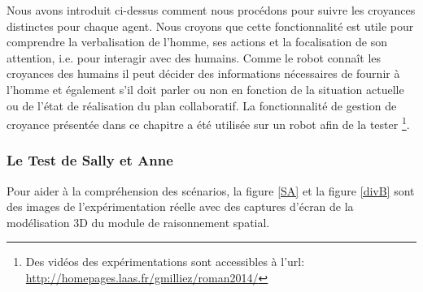 \documentclass[a4paper,11pt,twoside]{StyleThese}
\begin{document}
Nous avons introduit ci-dessus comment nous procédons pour suivre les croyances distinctes pour chaque agent. Nous croyons que cette fonctionnalité est utile pour comprendre la verbalisation de l'homme, ses actions et la focalisation de son attention, i.e. pour interagir avec des humains. Comme le robot connaît les croyances des humains il peut décider des informations nécessaires de fournir à l'homme et également s'il doit parler ou non en fonction de la situation actuelle ou de l'état de réalisation du plan collaboratif. La fonctionnalité de gestion de croyance présentée dans ce chapitre a été utilisée sur un robot afin de la tester \footnote{Des vidéos des expérimentations sont accessibles à l'url: \url{http://homepages.laas.fr/gmilliez/roman2014/}}.




\subsubsection{Le Test de Sally et Anne}

Pour aider à la compréhension des scénarios, la figure \ref{SA} et la figure  \ref{divB} sont des images de l'expérimentation réelle avec des captures d'écran de la modélisation 3D du module de raisonnement spatial.
\end{document}
